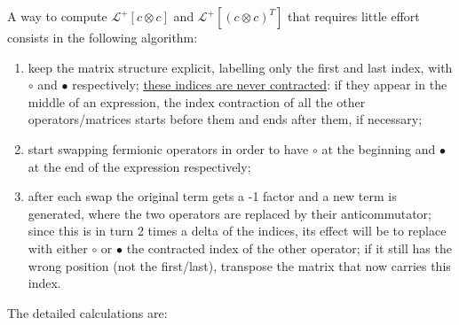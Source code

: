 \documentclass[a4paper,11pt]{article}
\theoremstyle{remark}
\newcommand{\nl}{\vskip 0.3cm}
\newcommand{\ubar}[1]{\underline{#1}}
\begin{document}
  A way to compute  $\mathcal{L}^+\!\!\left[c\otimes c\right]$ and $\mathcal{L}^+\!\!\left[ (c\otimes c)^T\right]$ that requires little effort consists in the following algorithm:
  \begin{enumerate}
   \item keep the matrix structure explicit, labelling only the first and last index, with $ \circ$ and $\bullet$ respectively; \ubar{these indices are never contracted}: if they appear in the middle of an expression, the index contraction of all the other operators/matrices starts before them and ends after them, if necessary;
   \item start swapping fermionic operators in order to have $ \circ$ at the beginning and $\bullet$ at the end of the expression respectively; 
   \item after each swap the original term gets a -1 factor and a new term is generated, where the two operators are replaced by their anticommutator; since this is in turn 2 times a delta of the indices, its effect will be to replace with either $ \circ$ or $\bullet$ the contracted index of the other operator; if it still has the wrong position (not the first/last), transpose the matrix that now carries this index.
  \end{enumerate}\nl
  The detailed calculations are:
\end{document}
